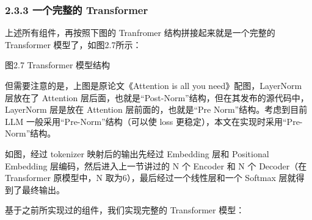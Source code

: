 \documentclass[
]{article}
\begin{document}
\subsubsection{2.3.3 一个完整的
Transformer}\label{ux4e00ux4e2aux5b8cux6574ux7684-transformer}

上述所有组件，再按照下图的 Tranfromer 结构拼接起来就是一个完整的
Transformer 模型了，如图2.7所示：

图2.7 Transformer 模型结构

但需要注意的是，上图是原论文《Attention is all you need》配图，LayerNorm
层放在了 Attention
层后面，也就是``Post-Norm''结构，但在其发布的源代码中，LayerNorm
层是放在 Attention 层前面的，也就是``Pre Norm''结构。考虑到目前 LLM
一般采用``Pre-Norm''结构（可以使 loss
更稳定），本文在实现时采用``Pre-Norm''结构。

如图，经过 tokenizer 映射后的输出先经过 Embedding 层和 Positional
Embedding 层编码，然后进入上一节讲过的 N 个 Encoder 和 N 个 Decoder（在
Transformer 原模型中，N 取为6），最后经过一个线性层和一个 Softmax
层就得到了最终输出。

基于之前所实现过的组件，我们实现完整的 Transformer 模型：
\end{document}

